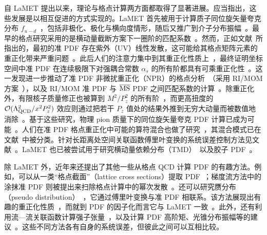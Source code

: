 自 LaMET 提出以来，理论与格点计算两方面都取得了显著进展。应当指出，这些发展是以相互促进的方式实现的。LaMET 首先被用于计算质子同位旋矢量夸克分布 $f_{u-d}$~\cite{Lin:2014zya,Alexandrou:2015rja,Chen:2016utp,Alexandrou:2016jqi,Chen:2018fwa,Alexandrou:2018eet}，包括非极化、极化与横向度情形，随后又推广到介子分布振幅~\cite{Zhang:2017bzy,Chen:2017gck}。最早的格点研究采用的是横动量截断方案下一圈阶的匹配系数~\cite{Xiong:2013bka,Ji:2015qla,Xiong:2015nua}。然而，正如文献~\cite{Xiong:2013bka}所指出的，最初的准 PDF 存在紫外（UV）线性发散，这可能给其格点矩阵元素的重正化带来严重问题~\cite{Li:2016amo,Rossi:2017muf,Rossi:2018zkn}。此后人们的注意力集中到其重正化性质上~\cite{Ji:2015jwa,Ishikawa:2016znu,Chen:2016fxx,Xiong:2017jtn,Constantinou:2017sej,Ji:2017oey,Ishikawa:2017faj,Green:2017xeu,Spanoudes:2018zya}，最终证明坐标空间中准 PDF 在连续极限下对强耦合常数 $\alpha_s$ 的所有阶都具有可乘重正化性~\cite{Ji:2017oey,Ishikawa:2017faj}。这一发现进一步推动了准 PDF 非微扰重正化（NPR）的格点分析~\cite{Alexandrou:2017huk,Chen:2017mzz,Green:2017xeu}（采用 RI/MOM 方案~\cite{Martinelli:1994ty}），以及 RI/MOM 准 PDF 与 $\overline{\rm MS}$ PDF 之间匹配系数的计算~\cite{Stewart:2017tvs}。除重正化外，有限核子质量修正也被算到 $M^2/P_z^2$ 的所有阶~\cite{Chen:2016utp}，而更高扭度的 $\mathcal O(\Lambda^2_{\rm QCD}/x^2P_z^2)$ 效应则通过把若干 $P_z$ 值处的结果外推到无穷大动量而被数值地消除~\cite{Lin:2014zya,Chen:2016utp}。基于这些研究，物理 pion 质量下的同位旋矢量夸克 PDF 计算已成为可能~\cite{Lin:2017ani,Alexandrou:2018pbm,Chen:2018xof,Alexandrou:2018eet}。人们在准 PDF 格点重正化中可能的算符混合也做了研究~\cite{Constantinou:2017sej,Alexandrou:2017huk,Green:2017xeu,Chen:2017mzz}，其混合模式已在文献~\cite{Chen:2017mie}中被分类。针对长距离处空间关联函数傅里叶变换的系统误差控制方法见文献~\cite{Lin:2017ani,Chen:2017lnm}。LaMET 也已被尝试用于研究横动量依赖分布（TMD）~\cite{Ji:2014hxa,Ji:2018hvs,Ebert:2018gzl,Ebert:2019okf,Ebert:2019tvc,Ji:2019sxk,Shanahan:2019zcq,Ji:2019ewn}以及胶子 PDF~\cite{Wang:2017qyg,Wang:2017eel,Fan:2018dxu,Zhang:2018diq,Li:2018tpe,Wang:2019tgg}。

除 LaMET 外，近年来还提出了其他一些从格点 QCD 计算 PDF 的有趣方法。例如，可以从一类“格点截面”（lattice cross sections）提取 PDF~\cite{Ma:2014jla,Ma:2017pxb}；梯度流方法中的涂抹准 PDF 则被提出来扫除格点计算中的幂次发散~\cite{Monahan:2016bvm,Monahan:2017hpu}。还可以研究赝分布（pseudo distribution）~\cite{Radyushkin:2017cyf}，它通过傅里叶变换与准 PDF 相联系。该方法展现出有趣的重正化性质~\cite{Orginos:2017kos,Karpie:2017bzm}，而就到 PDF 的因子化而言它与 LaMET 一致~\cite{Ji:2017rah,Zhang:2018ggy,Izubuchi:2018srq}。此外，还有利用流—流关联函数计算强子张量~\cite{Liu:1993cv,Liang:2017mye}，以及计算 PDF 高阶矩、光锥分布振幅等的建议~\cite{Detmold:2005gg,Braun:2007wv,Liang:2017mye,Chambers:2017dov,Bali:2018spj,Bali:2019ecy}。这些不同方法各有自身的系统误差，但彼此之间可以互相比较。

